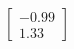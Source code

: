 \documentclass[preview]{standalone}
\begin{document}
\begin{align*}
\begin{bmatrix} -0.99 \\ 1.33 \end{bmatrix}
\end{align*}
\end{document}
